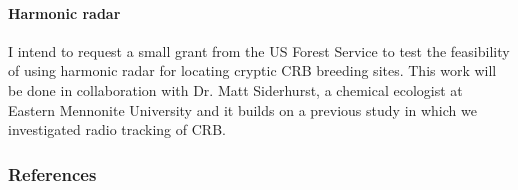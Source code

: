 \begin{refsection}
\paragraph{Harmonic radar} I intend to request a small grant from the US Forest Service to test the feasibility of using harmonic radar for locating cryptic CRB breeding sites. This work will be done in collaboration with Dr. Matt Siderhurst, a chemical ecologist at Eastern Mennonite University and it builds on a previous study in which we investigated radio tracking of CRB.

\subsubsection{References}
\printbibliography[heading=none]

\end{refsection}


